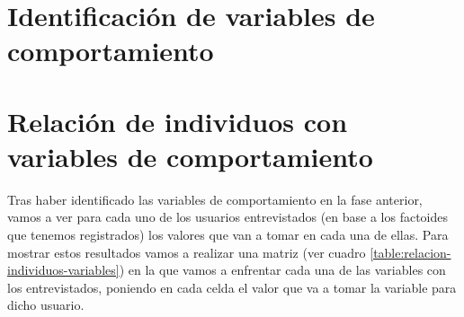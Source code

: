 \section{Identificación de variables de comportamiento}
\section{Relación de individuos con variables de comportamiento}
Tras haber identificado las variables de comportamiento en la fase anterior, vamos a ver para cada uno de los usuarios entrevistados (en base a los factoides
que tenemos registrados) los valores que van a tomar en cada una de ellas. Para mostrar estos resultados vamos a realizar una matriz (ver cuadro \ref{table:relacion-individuos-variables})
en la que vamos a enfrentar cada una de las variables con los entrevistados, poniendo en cada celda el valor que va a tomar la variable para dicho usuario.
